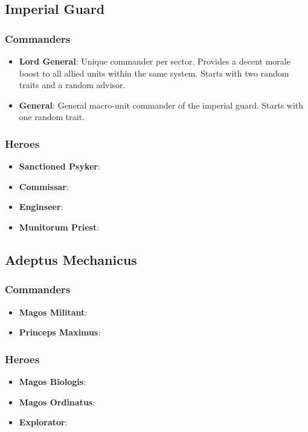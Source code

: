 \subsection{Imperial Guard}
\subsubsection{Commanders}
\begin{itemize}
    \item \textbf{Lord General}: Unique commander per sector. Provides a decent morale boost to all allied units within the same system. Starts with two random traits and a random advisor.
    \item \textbf{General}: General macro-unit commander of the imperial guard. Starts with one random trait.
\end{itemize}
\subsubsection{Heroes}
\begin{itemize}
    \item \textbf{Sanctioned Psyker}:
    \item \textbf{Commissar}:
    \item \textbf{Enginseer}:
    \item \textbf{Munitorum Priest}:
\end{itemize}

\subsection{Adeptus Mechanicus}
\subsubsection{Commanders}
\begin{itemize}
    \item \textbf{Magos Militant}:
    \item \textbf{Princeps Maximus}:
\end{itemize}
\subsubsection{Heroes}
\begin{itemize}
    \item \textbf{Magos Biologis}:
    \item \textbf{Magos Ordinatus}:
    \item \textbf{Explorator}:
\end{itemize}

